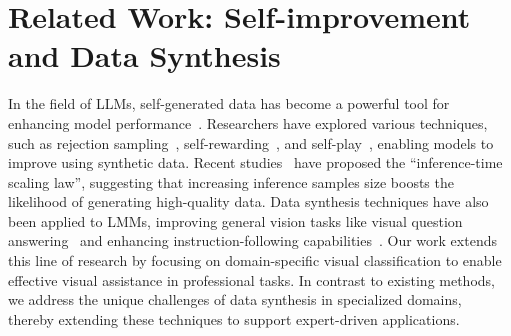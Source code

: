 \section{Related Work: Self-improvement and Data Synthesis}
In the field of LLMs, self-generated data has become a powerful tool for enhancing model performance~\citep{liu2024best}. Researchers have explored various techniques, such as rejection sampling~\citep{touvron2023llama, dubey2024llama}, self-rewarding~\citep{yuan2024self}, and self-play~\citep{chen2024self}, enabling models to improve using synthetic data. Recent studies~\citep{snell2024scaling, brown2024large} have proposed the ``inference-time scaling law'', suggesting that increasing inference samples size boosts the likelihood of generating high-quality data.
Data synthesis techniques have also been applied to LMMs, improving general vision tasks like visual question answering~\citep{zhou2024aligning, deng2024enhancing, gao2023g, zhou2024calibrated} and enhancing instruction-following capabilities~\citep{luo2024mmevol}. Our work extends this line of research by focusing on domain-specific visual classification to enable effective visual assistance in professional tasks. In contrast to existing methods, we address the unique challenges of data synthesis in specialized domains, thereby extending these techniques to support expert-driven applications.